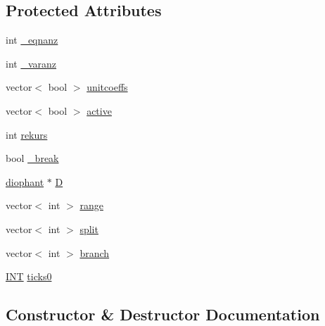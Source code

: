 \subsection*{Protected Attributes}
\begin{DoxyCompactItemize}
\item 
int \mbox{\hyperlink{classmckay_1_1t_m_c_k_a_y_ab7812cb1bb7afcaff01433556c6574d5}{\+\_\+eqnanz}}
\item 
int \mbox{\hyperlink{classmckay_1_1t_m_c_k_a_y_a5ca1f4da421400510c298d8cfe75471b}{\+\_\+varanz}}
\item 
vector$<$ bool $>$ \mbox{\hyperlink{classmckay_1_1t_m_c_k_a_y_a640367986232519161646d7fde5fa1d4}{unitcoeffs}}
\item 
vector$<$ bool $>$ \mbox{\hyperlink{classmckay_1_1t_m_c_k_a_y_a237e335b7277a08587ce54ee12236963}{active}}
\item 
int \mbox{\hyperlink{classmckay_1_1t_m_c_k_a_y_aed51a894d0d8987f91afc7414f68f531}{rekurs}}
\item 
bool \mbox{\hyperlink{classmckay_1_1t_m_c_k_a_y_a64271150d4cbf651ec12f59224087752}{\+\_\+break}}
\item 
\mbox{\hyperlink{classdiophant}{diophant}} $\ast$ \mbox{\hyperlink{classmckay_1_1t_m_c_k_a_y_a9e645f5be4d62b67821d57330f31728d}{D}}
\item 
vector$<$ int $>$ \mbox{\hyperlink{classmckay_1_1t_m_c_k_a_y_abe2a7638eb0da6af5d1fddf73a00b0ee}{range}}
\item 
vector$<$ int $>$ \mbox{\hyperlink{classmckay_1_1t_m_c_k_a_y_ab2bd8c66986a510d4479979f3ca8f296}{split}}
\item 
vector$<$ int $>$ \mbox{\hyperlink{classmckay_1_1t_m_c_k_a_y_a37d34888869fad1a820a627482e439f0}{branch}}
\item 
\mbox{\hyperlink{galois_8h_a09fddde158a3a20bd2dcadb609de11dc}{I\+NT}} \mbox{\hyperlink{classmckay_1_1t_m_c_k_a_y_a9d002a160bc378bd660fc118a0157e75}{ticks0}}
\end{DoxyCompactItemize}


\subsection{Constructor \& Destructor Documentation}
\mbox{\label{classmckay_1_1t_m_c_k_a_y_a06d898c12ad8b7660e567044a84d9c91}} 
